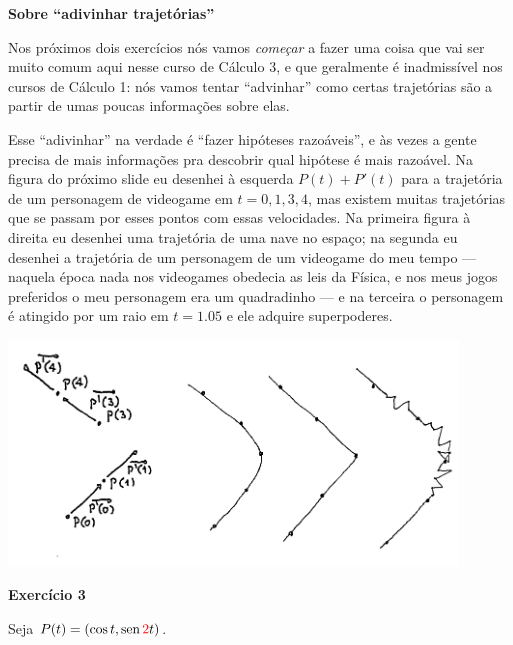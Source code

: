 \documentclass[oneside,12pt]{article}
\begin{document}
{\bf Sobre ``adivinhar trajetórias''}

Nos próximos dois exercícios nós vamos {\sl começar} a fazer uma coisa
que vai ser muito comum aqui nesse curso de Cálculo 3, e que
geralmente é inadmissível nos cursos de Cálculo 1: nós vamos tentar
``advinhar'' como certas trajetórias são a partir de umas poucas
informações sobre elas.

Esse ``adivinhar'' na verdade é ``fazer hipóteses razoáveis'', e às
vezes a gente precisa de mais informações pra descobrir qual hipótese
é mais razoável. Na figura do próximo slide eu desenhei à esquerda
$P(t)+P'(t)$ para a trajetória de um personagem de videogame em
$t=0,1,3,4$, mas existem muitas trajetórias que se passam por esses
pontos com essas velocidades. Na primeira figura à direita eu desenhei
uma trajetória de uma nave no espaço; na segunda eu desenhei a
trajetória de um personagem de um videogame do meu tempo --- naquela
época nada nos videogames obedecia as leis da Física, e nos meus jogos
preferidos o meu personagem era um quadradinho --- e na terceira o
personagem é atingido por um raio em $t=1.05$ e ele adquire
superpoderes.

\bsk

\includegraphics[height=6cm]{2021-1-C3/20210618_trajetorias.pdf}

\newpage


\vspace*{-0.75cm}

{\bf Exercício 3}

Seja $P(t) = (\cos t, \sen \ColorRed{2}t)$.
\end{document}
